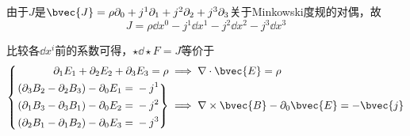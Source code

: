 由于$J$是$\bvec{J}=\rho\partial_0+j^1\partial_1+j^2\partial_2+j^3\partial_3$关于Minkowski度规的对偶，故
\begin{equation}
J = \rho\dd x^0 - j^1\dd x^1 - j^2\dd x^2 - j^3\dd x^3
\end{equation}

比较各$\dd x^i$前的系数可得，$\star \dd \star F = J$等价于
\begin{equation}
\left\{
\begin{aligned}
\partial_1E_1+\partial_2E_2+\partial_3E_3 = \rho&\implies \nabla\cdot \bvec{E}=\rho\\
\left.
\begin{aligned}
(\partial_3B_2-\partial_2B_3)-\partial_0E_1 ={}& -j^1\\
(\partial_1B_3-\partial_3B_1)-\partial_0E_2 ={}& -j^2\\
(\partial_2B_1-\partial_1B_2)-\partial_0E_3 ={}& -j^3
\end{aligned}
\right\}&
\implies \nabla\times \bvec{B}-\partial_0\bvec{E}=-\bvec{j}
\end{aligned}
\right. 
\end{equation}

















